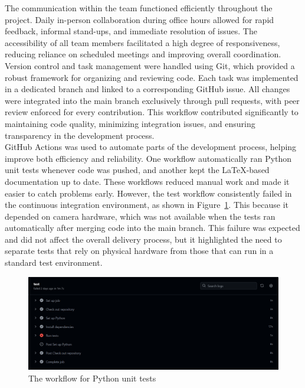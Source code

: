The communication within the team functioned efficiently throughout the project. Daily in-person collaboration during office hours allowed for rapid feedback, informal stand-ups, and immediate resolution of issues. The accessibility of all team members facilitated a high degree of responsiveness, reducing reliance on scheduled meetings and improving overall coordination.\\

Version control and task management were handled using Git, which provided a robust framework for organizing and reviewing code. Each task was implemented in a dedicated branch and linked to a corresponding GitHub issue. All changes were integrated into the main branch exclusively through pull requests, with peer review enforced for every contribution. This workflow contributed significantly to maintaining code quality, minimizing integration issues, and ensuring transparency in the development process. \\

GitHub Actions was used to automate parts of the development process, helping improve both efficiency and reliability. One workflow automatically ran Python unit tests whenever code was pushed, and another kept the LaTeX-based documentation up to date. These workflows reduced manual work and made it easier to catch problems early. However, the test workflow consistently failed in the continuous integration environment, as shown in Figure~\ref{fig:workflow-test}. This because it depended on camera hardware, which was not available when the tests ran automatically after merging code into the main branch. This failure was expected and did not affect the overall delivery process, but it highlighted the need to separate tests that rely on physical hardware from those that can run in a standard test environment. \\

\begin{figure}[h!] \centering 
\includegraphics[width=0.75\linewidth]{figures/results/workflows/tests.png}\caption[Python tests workflow]{The workflow for Python unit tests}\label{fig:workflow-test} \end{figure}

